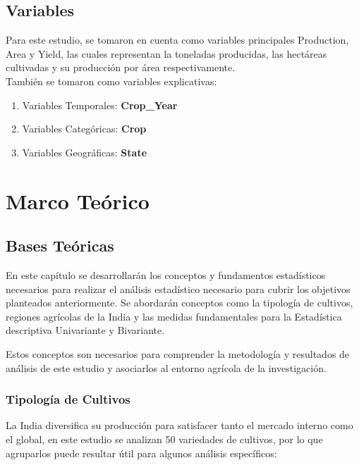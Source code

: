 \documentclass[oneside,11pt]{Latex/Classes/PhDthesisPSnPDF}
\begin{document}
\section{Variables}

Para este estudio, se tomaron en cuenta como variables principales
Production, Area y Yield, las cuales representan la toneladas
producidas, las hectáreas cultivadas y su producción por área
respectivamente.\\

También se tomaron como variables explicativas:

\begin{enumerate}
  \item Variables Temporales: \textbf{Crop\_Year}
  \item Variables Categóricas: \textbf{Crop}
  \item Variables Geográficas: \textbf{State}
\end{enumerate}

\chapter{Marco Teórico}

\section{Bases Teóricas}

En este capítulo se desarrollarán los conceptos y fundamentos
estadísticos necesarios para realizar el análisis estadístico necesario
para cubrir los objetivos planteados anteriormente. Se abordarán
conceptos como la tipología de cultivos, regiones agrícolas de la India
y las medidas fundamentales para la Estadística descriptiva Univariante
y Bivariante.

Estos conceptos son necesarios para comprender la metodología y
resultados de análisis de este estudio y asociarlos al entorno agrícola
de la investigación.\\

\subsection{Tipología de Cultivos}

La India diversifica su producción para satisfacer tanto el mercado
interno como el global, en este estudio se analizan 50 variedades de
cultivos, por lo que agruparlos puede resultar útil para algunos
análisis específicos:
\end{document}
